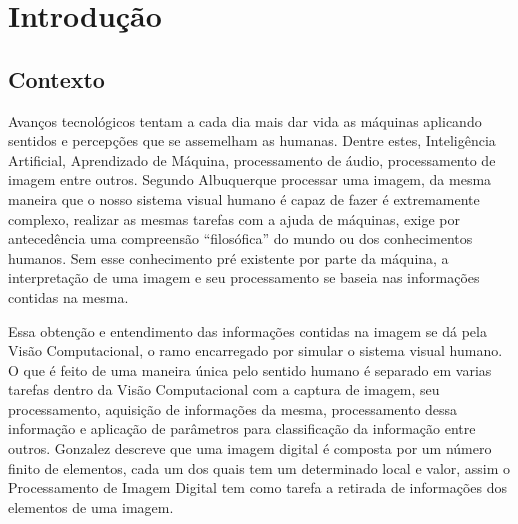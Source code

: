 \chapter{Introdução} \label{Cap:Introducao}
\section{Contexto}
Avanços tecnológicos tentam a cada dia mais dar vida as máquinas aplicando sentidos e percepções que se assemelham as humanas. Dentre estes, Inteligência Artificial, Aprendizado de Máquina, processamento de áudio, processamento de imagem entre outros. Segundo Albuquerque\cite{Albuquerque:2001} processar uma imagem, da mesma maneira que o nosso sistema visual humano é capaz de fazer é extremamente complexo, realizar as mesmas tarefas com a ajuda de máquinas, exige por antecedência uma compreensão “filosófica” do mundo ou dos conhecimentos humanos. Sem esse conhecimento pré existente por parte da máquina, a interpretação de uma imagem e seu processamento se baseia nas informações contidas na mesma.
	
	 Essa obtenção e entendimento das informações contidas na imagem se dá pela Visão Computacional, o ramo encarregado por simular o sistema visual humano. O que é feito de uma maneira única pelo sentido humano é separado em varias tarefas dentro da Visão Computacional com a captura de imagem, seu processamento, aquisição de informações da mesma, processamento dessa informação e aplicação de parâmetros para classificação da informação entre outros. Gonzalez\cite{Gonzalez:2008} descreve que uma imagem digital é composta por um número finito de elementos, cada um dos quais tem um determinado local e valor, assim o Processamento de Imagem Digital tem como tarefa a retirada de informações dos elementos de uma imagem.
	
